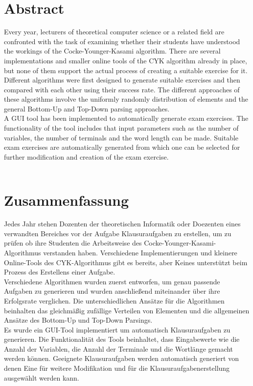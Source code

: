 \section*{Abstract}\label{abtract}
Every year, lecturers of theoretical computer science or a related field are confronted with the task of examining whether their students have understood the workings of the Cocke-Younger-Kasami algorithm. There are several implementations and smaller online tools of the CYK algorithm already in place, but none of them support the actual process of creating a suitable exercise for it.\\
Different algorithms were first designed to generate suitable exercises and then compared with each other using their success rate. The different approaches of these algorithms involve the uniformly randomly distribution of elements and the general Bottom-Up and Top-Down parsing approaches.\\
A GUI tool has been implemented to automatically generate exam exercises. The functionality of the tool includes that input parameters such as the number of variables, the number of terminals and the word length can be made. Suitable exam exercises are automatically generated from which one can be selected for further modification and creation of the exam exercise.\\

~~

\section*{Zusammenfassung}\label{zusammenfassung}
Jedes Jahr stehen Dozenten der theoretischen Informatik oder Doezenten eines verwandten Bereiches vor der Aufgabe Klausuraufgaben zu erstellen, um zu prüfen ob ihre Studenten die Arbeitsweise des Cocke-Younger-Kasami-Algorithmus verstanden haben. Verschiedene Implementierungen und kleinere Online-Tools des CYK-Algorithmus gibt es bereits, aber Keines unterstützt beim Prozess des Erstellens einer Aufgabe.\\
Verschiedene Algorithmen wurden zuerst entworfen, um genau passende Aufgaben zu generieren und wurden anschließend miteinander über ihre Erfolgsrate verglichen. Die unterschiedlichen Ansätze für die Algorithmen beinhalten das gleichmäßig zufällige Verteilen von Elementen und die allgemeinen Ansätze des Bottom-Up und Top-Down Parsings.\\
Es wurde ein GUI-Tool implementiert um automatisch Klausuraufgaben zu generieren. Die Funktionalität des Tools beinhaltet, dass Eingabewerte wie die Anzahl der Variablen, die Anzahl der Terminale und die Wortlänge gemacht werden können. Geeignete Klausuraufgaben werden automatisch generiert von denen Eine für weitere Modifikation und für die Klausuraufgabenerstellung ausgewählt werden kann.\\



\pagebreak

